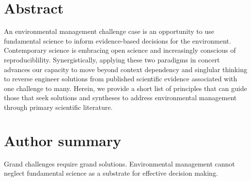 \documentclass[10pt,letterpaper]{article}
\date{}
\newcommand{\getIndex}[2]{
  \ForEach{,}{\IfEq{#1}{\thislevelitem}{\number\thislevelcount\ExitForEach}{}}{#2}
}
\newcommand{\getAff}[1]{
  \getIndex{#1}{York University}
}
\begin{document}
\vspace*{0.2in}

\section*{Abstract}
An environmental management challenge case is an opportunity to use
fundamental science to inform evidence-based decisions for the
environment. Contemporary science is embracing open science and
increasingly conscious of reproduciblility. Synergistically, applying
these two paradigms in concert advances our capacity to move beyond
context dependency and singlular thinking to reverse engineer solutions
from published scientific evidence associated with one challenge to
many. Herein, we provide a short list of principles that can guide those
that seek solutions and syntheses to address environmental management
through primary scientific literature.

\section*{Author summary}
Grand challenges require grand solutions. Environmental management
cannot neglect fundamental science as a substrate for effective decision
making.

\linenumbers
\end{document}
